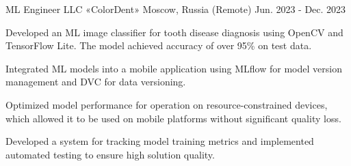\begin{cventries}
  \cventry
    {ML Engineer} %
    {LLC «ColorDent»} %
    {Moscow, Russia (Remote)} %
    {Jun. 2023 - Dec. 2023} %
    {
      \begin{cvitems} %
        \item {Developed an ML image classifier for tooth disease diagnosis using OpenCV and TensorFlow Lite. The model achieved accuracy of over 95\% on test data.}
        \item {Integrated ML models into a mobile application using MLflow for model version management and DVC for data versioning.}
        \item {Optimized model performance for operation on resource-constrained devices, which allowed it to be used on mobile platforms without significant quality loss.}
        \item {Developed a system for tracking model training metrics and implemented automated testing to ensure high solution quality.}
      \end{cvitems}
    }

\end{cventries}